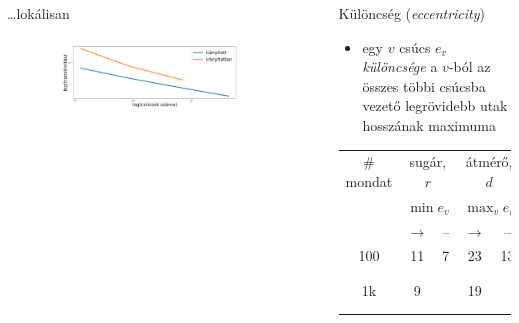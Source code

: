 \documentclass{beamer}
\newlength{\sepwid}
\newlength{\onecolwid}
\newlength{\twocolwid}
\begin{document}
\begin{frame}[t]
\begin{columns}[t]
\begin{column}{\onecolwid}
\begin{block}{\dots lokálisan}
\begin{figure}
              \includegraphics[width=\columnwidth]{img/trans}
          \end{figure}
        \end{block}
      \end{column}

    \begin{column}{\sepwid} \end{column}   %

      \begin{column}{\twocolwid} %

        \begin{columns} %
          \begin{column}{\onecolwid}

            \begin{block}{Különcség (\emph{eccentricity})}
              \begin{itemize}
                \item egy $v$ csúcs $e_v$ \emph{különcsége} 
                  a $v$-ból az összes többi csúcsba vezető legrövidebb utak
                        hosszának maximuma
              \end{itemize}
              \begin{table}
                \begin{tabular}{c|cccccc}
                  \toprule
                      \# mondat & \multicolumn{2}{c}{sugár, $r$} &
                      \multicolumn{2}{c}{átmérő, $d$} &
                      center  & periféria \\   
                      & \multicolumn{2}{c}{$\min e_v$} & \multicolumn{2}{c}{$\max_v
                      e_v$} & $\{v\mid e_v=r\}$ & $\{v\mid e_v=d\}$\\ 
                      & $\rightarrow$ & -- & $\rightarrow$ & -- \\
                      \midrule
                      100 & 11 & 7 & 23 & 13 & \{\texttt ., \texttt !, \texttt ?\} &
                      \{nádcukorból\}\\
                      1k  &  9 &   & 19 &    & \{\texttt ,\} & \{Megadható, two\}\\
                      \bottomrule 
                \end{tabular}
              \end{table} 
            \end{block}
          \end{column} 


\end{columns}
\end{column}
\end{columns}
\end{frame}
\end{document}
